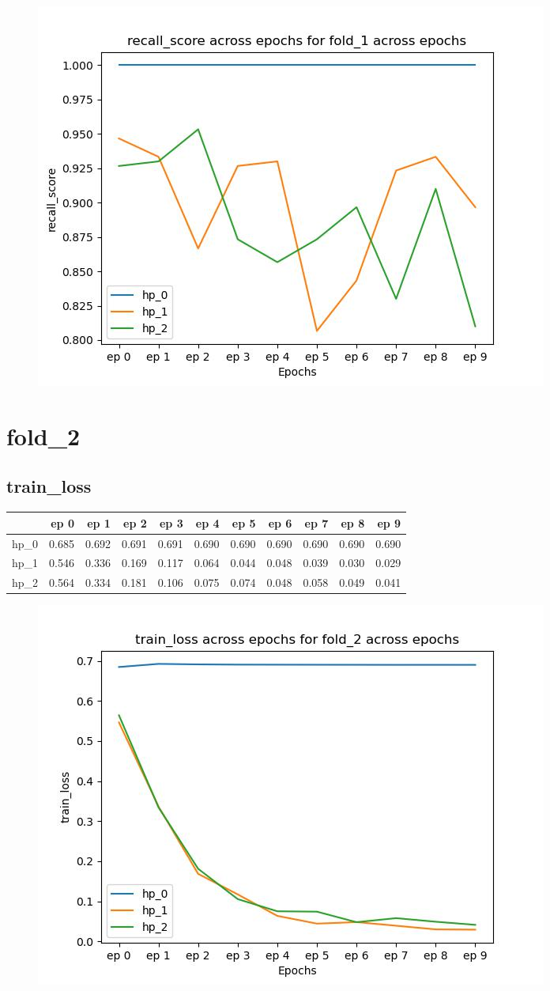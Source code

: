 \documentclass{article}
\begin{document}
\begin{figure}[H]
\includegraphics[scale = 0.75]{fold_1/recall_score}
\end{figure}
\section{fold\_2}
\subsection{train\_loss}
\begin{tabular}{lrrrrrrrrrr}
\toprule
{} &   ep 0 &   ep 1 &   ep 2 &   ep 3 &   ep 4 &   ep 5 &   ep 6 &   ep 7 &   ep 8 &   ep 9 \\
\midrule
hp\_0 &  0.685 &  0.692 &  0.691 &  0.691 &  0.690 &  0.690 &  0.690 &  0.690 &  0.690 &  0.690 \\
hp\_1 &  0.546 &  0.336 &  0.169 &  0.117 &  0.064 &  0.044 &  0.048 &  0.039 &  0.030 &  0.029 \\
hp\_2 &  0.564 &  0.334 &  0.181 &  0.106 &  0.075 &  0.074 &  0.048 &  0.058 &  0.049 &  0.041 \\
\bottomrule
\end{tabular}

\begin{figure}[H]
\includegraphics[scale = 0.75]{fold_2/train_loss}
\end{figure}
\end{document}
